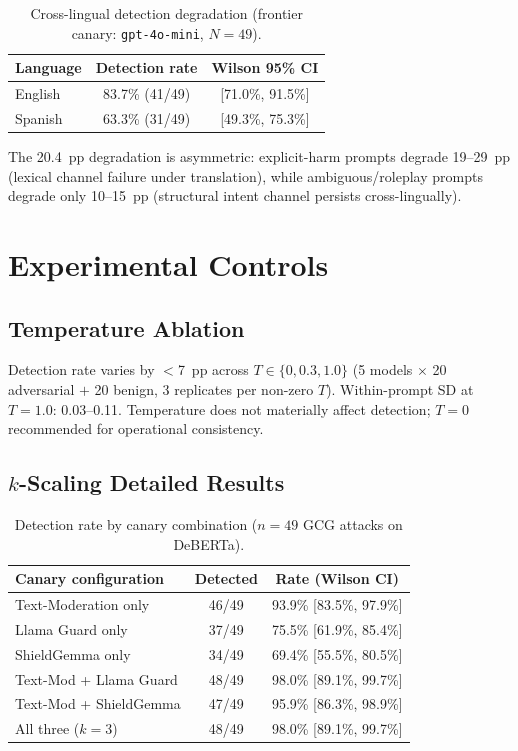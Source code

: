 \documentclass{article}
\begin{document}
\begin{table}[h]
\caption{Cross-lingual detection degradation (frontier canary: \texttt{gpt-4o-mini}, $N{=}49$).}
\centering
\small
\begin{tabular}{lcc}
\toprule
\textbf{Language} & \textbf{Detection rate} & \textbf{Wilson 95\% CI} \\
\midrule
English & 83.7\% (41/49) & [71.0\%, 91.5\%] \\
Spanish & 63.3\% (31/49) & [49.3\%, 75.3\%] \\
\bottomrule
\end{tabular}
\end{table}

The 20.4~pp degradation is asymmetric: explicit-harm prompts degrade 19--29~pp (lexical channel failure under translation), while ambiguous/roleplay prompts degrade only 10--15~pp (structural intent channel persists cross-lingually).


\section{Experimental Controls}
\label{app:controls}

\subsection{Temperature Ablation}

Detection rate varies by $<$7~pp across $T \in \{0, 0.3, 1.0\}$ (5 models $\times$ 20 adversarial $+$ 20 benign, 3 replicates per non-zero $T$). Within-prompt SD at $T{=}1.0$: 0.03--0.11. Temperature does not materially affect detection; $T{=}0$ recommended for operational consistency.

\subsection{$k$-Scaling Detailed Results}

\begin{table}[h]
\caption{Detection rate by canary combination ($n{=}49$ GCG attacks on DeBERTa).}
\centering
\small
\begin{tabular}{lcc}
\toprule
\textbf{Canary configuration} & \textbf{Detected} & \textbf{Rate (Wilson CI)} \\
\midrule
Text-Moderation only & 46/49 & 93.9\% [83.5\%, 97.9\%] \\
Llama Guard only & 37/49 & 75.5\% [61.9\%, 85.4\%] \\
ShieldGemma only & 34/49 & 69.4\% [55.5\%, 80.5\%] \\
Text-Mod + Llama Guard & 48/49 & 98.0\% [89.1\%, 99.7\%] \\
Text-Mod + ShieldGemma & 47/49 & 95.9\% [86.3\%, 98.9\%] \\
All three ($k{=}3$) & 48/49 & 98.0\% [89.1\%, 99.7\%] \\
\bottomrule
\end{tabular}
\end{table}
\end{document}
